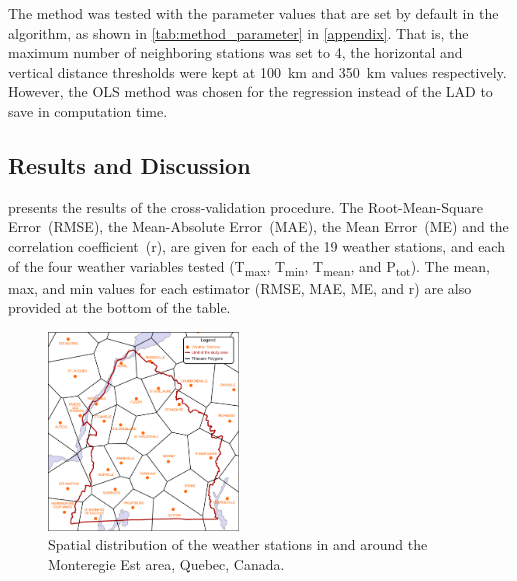 \documentclass[TechnicalNoteMeteo.tex]{subfiles}
\begin{document}
The method was tested with the parameter values that are set by default in the algorithm, as shown in \cref{tab:method_parameter} in \ref{appendix}. That is, the maximum number of neighboring stations was set to 4, the horizontal and vertical distance thresholds were kept at \SI{100}{km} and \SI{350}{km} values respectively. However, the OLS method was chosen for the regression instead of the LAD to save in computation time.

\subsection{Results and Discussion}

 presents the results of the cross-validation procedure. The Root-Mean-Square Error~(RMSE), the Mean-Absolute Error~(MAE), the Mean Error~(ME) and the correlation coefficient~(r), are given for each of the 19 weather stations, and each of the four weather variables tested (T\textsubscript{max}, T\textsubscript{min}, T\textsubscript{mean}, and P\textsubscript{tot}). The mean, max, and min values for each estimator (RMSE, MAE, ME, and r) are also provided at the bottom of the table.



\begin{figure}[th!]
    \centering
    \includegraphics[width=0.45\textwidth]{img/Thiessen_meteo}
    \caption{Spatial distribution of the weather stations in and around the Monteregie Est area, Quebec, Canada.}
    \label{fig:Thiessen_meteo}  
\end{figure}
\end{document}
